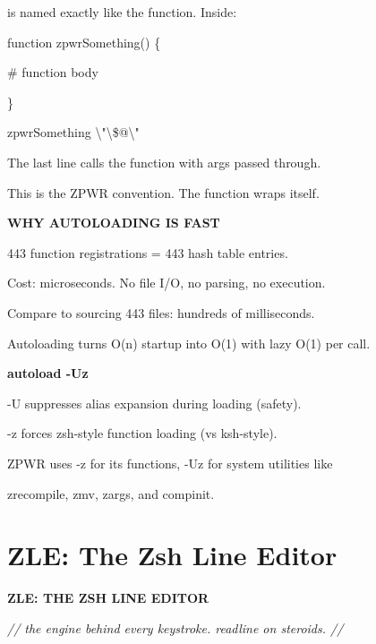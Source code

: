 \documentclass[11pt,a4paper,twoside]{book}
\begin{document}
is named exactly like the function. Inside:

\begin{codebox}
function zpwrSomething() \{\\
\end{codebox}

\# function body

\}

\begin{codebox}
zpwrSomething \textbackslash{}"\textbackslash{}\$@\textbackslash{}"\\
\end{codebox}

The last line calls the function with args passed through.

This is the ZPWR convention. The function wraps itself.


\vspace{12pt}
{\bfseries\color{neonyellow} WHY AUTOLOADING IS FAST}\vspace{4pt}

443 function registrations = 443 hash table entries.

Cost: microseconds. No file I/O, no parsing, no execution.

Compare to sourcing 443 files: hundreds of milliseconds.

Autoloading turns O(n) startup into O(1) with lazy O(1) per call.


\vspace{12pt}
{\bfseries\color{neonyellow} autoload -Uz}\vspace{4pt}

-U suppresses alias expansion during loading (safety).

-z forces zsh-style function loading (vs ksh-style).

ZPWR uses -z for its functions, -Uz for system utilities like

zrecompile, zmv, zargs, and compinit.


\vspace{16pt}

\section{ZLE: The Zsh Line Editor}


\vspace{10pt}
{\large\bfseries\color{neoncyan} ZLE: THE ZSH LINE EDITOR}\vspace{6pt}

{\small\itshape\color{dimtext} // the engine behind every keystroke. readline on steroids. //}
\end{document}
